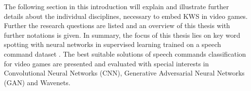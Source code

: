 The following section in this introduction will explain and illustrate further details about the individual disciplines, necessary to embed KWS in video games. 
Further the research questions are listed and an overview of this thesis with further notations is given.
In summary, the focus of this thesis lies on key word spotting with neural networks in supervised learning trained on a speech command dataset \cite{Warden2018}.
The best suitable solutions of speech commands classification for video games are presented and evaluated with special interests in Convolutional Neural Networks (CNN), Generative Adversarial Neural Networks (GAN) and Wavenets.






%
%
%





